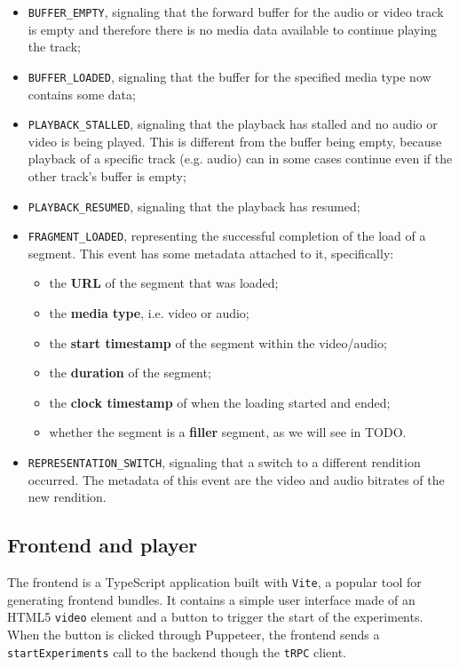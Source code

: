 \begin{itemize}
    \item \texttt{BUFFER\_EMPTY}, signaling that the forward buffer for the audio or video track is empty and therefore there is no media data available to continue playing the track;
    \item \texttt{BUFFER\_LOADED}, signaling that the buffer for the specified media type now contains some data;
    \item \texttt{PLAYBACK\_STALLED}, signaling that the playback has stalled and no audio or video is being played. This is different from the buffer being empty, because playback of a specific track (e.g. audio) can in some cases continue even if the other track's buffer is empty;
    \item \texttt{PLAYBACK\_RESUMED}, signaling that the playback has resumed;
    \item \texttt{FRAGMENT\_LOADED}, representing the successful completion of the load of a segment. This event has some metadata attached to it, specifically:
        \begin{itemize}
            \item the \textbf{URL} of the segment that was loaded;
            \item the \textbf{media type}, i.e. video or audio;
            \item the \textbf{start timestamp} of the segment within the video/audio;
            \item the \textbf{duration} of the segment;
            \item the \textbf{clock timestamp} of when the loading started and ended;
            \item whether the segment is a \textbf{filler} segment, as we will see in TODO.
        \end{itemize}
    \item \texttt{REPRESENTATION\_SWITCH}, signaling that a switch to a different rendition occurred. The metadata of this event are the video and audio bitrates of the new rendition.
\end{itemize}

\subsection{Frontend and player}
\label{sec:eval/testbed/frontend}

The frontend is a TypeScript application built with \texttt{Vite}, a popular tool for generating frontend bundles. It contains a simple user interface made of an HTML5 \texttt{video} element and a button to trigger the start of the experiments. When the button is clicked through Puppeteer, the frontend sends a \texttt{startExperiments} call to the backend though the \texttt{tRPC} client.

